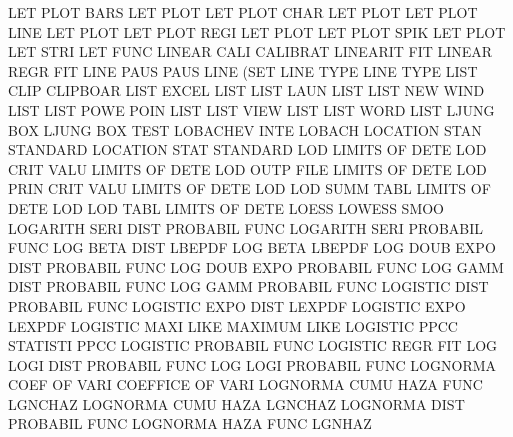 LET      PLOT BARS                      LET      PLOT
LET      PLOT CHAR                      LET      PLOT
LET      PLOT LINE                      LET      PLOT
LET      PLOT REGI                      LET      PLOT
LET      PLOT SPIK                      LET      PLOT
LET      STRI                           LET      FUNC
LINEAR   CALI                           CALIBRAT
LINEARIT                                FIT
LINEAR   REGR                           FIT
LINE     PAUS                           PAUS     LINE (SET
LINE     TYPE                           LINE     TYPE
LIST     CLIP                           CLIPBOAR
LIST     EXCEL                          LIST
LIST     LAUN                           LIST
LIST     NEW  WIND                      LIST
LIST     POWE POIN                      LIST
LIST     VIEW                           LIST
LIST     WORD                           LIST
LJUNG    BOX                            LJUNG    BOX  TEST
LOBACHEV INTE                           LOBACH
LOCATION STAN                           STANDARD
LOCATION STAT                           STANDARD
LOD                                     LIMITS   OF   DETE
LOD      CRIT VALU                      LIMITS   OF   DETE
LOD      OUTP FILE                      LIMITS   OF   DETE
LOD      PRIN CRIT VALU                 LIMITS   OF   DETE
LOD      LOD  SUMM TABL                 LIMITS   OF   DETE
LOD      LOD  TABL                      LIMITS   OF   DETE
LOESS                                   LOWESS   SMOO
LOGARITH SERI DIST                      PROBABIL FUNC
LOGARITH SERI                           PROBABIL FUNC
LOG      BETA DIST                      LBEPDF
LOG      BETA                           LBEPDF
LOG      DOUB EXPO DIST                 PROBABIL FUNC
LOG      DOUB EXPO                      PROBABIL FUNC
LOG      GAMM DIST                      PROBABIL FUNC
LOG      GAMM                           PROBABIL FUNC
LOGISTIC DIST                           PROBABIL FUNC
LOGISTIC EXPO DIST                      LEXPDF
LOGISTIC EXPO                           LEXPDF
LOGISTIC MAXI LIKE                      MAXIMUM  LIKE
LOGISTIC PPCC                           STATISTI PPCC
LOGISTIC                                PROBABIL FUNC
LOGISTIC REGR                           FIT
LOG      LOGI DIST                      PROBABIL FUNC
LOG      LOGI                           PROBABIL FUNC
LOGNORMA COEF OF   VARI                 COEFFICE OF   VARI
LOGNORMA CUMU HAZA FUNC                 LGNCHAZ
LOGNORMA CUMU HAZA                      LGNCHAZ
LOGNORMA DIST                           PROBABIL FUNC
LOGNORMA HAZA FUNC                      LGNHAZ
